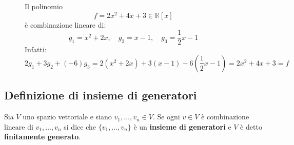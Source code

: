 \documentclass[a4paper]{article}
\theoremstyle{break}
\theoremstyle{break}
\theoremstyle{break}
\theoremstyle{break}
\begin{document}
  \begin{figure}[H]
    \begin{example}
      Il polinomio
      \[
        f = 2x^2 + 4x + 3 \in \mathbb{R}[x]
      \] 
      è combinazione lineare di:
      \[
      g_1 = x^2 + 2x, \quad g_2 = x-1, \quad g_3 = \frac{1}{2}x - 1
      \] 
      Infatti:
      \[
      2g_1+3g_2+(-6)g_3 = 2(x^2+2x) + 3(x-1) - 6\left( \frac{1}{2}x-1 \right) = 2x^2 + 4x + 3 = f
      \] 
    \end{example}
  \end{figure}

  \subsection{Definizione di insieme di generatori}
  Sia \( V \) uno spazio vettoriale e siano \( v_1, \ldots, v_n \in V \). Se ogni \( v \in V \) 
  è combinazione lineare di \( v_1, \ldots, v_n \) si dice che \( \{v_1, \ldots, v_n\}  \) 
  è un \textbf{insieme di generatori} e \( V \) è detto \textbf{finitamente generato}.
\end{document}
